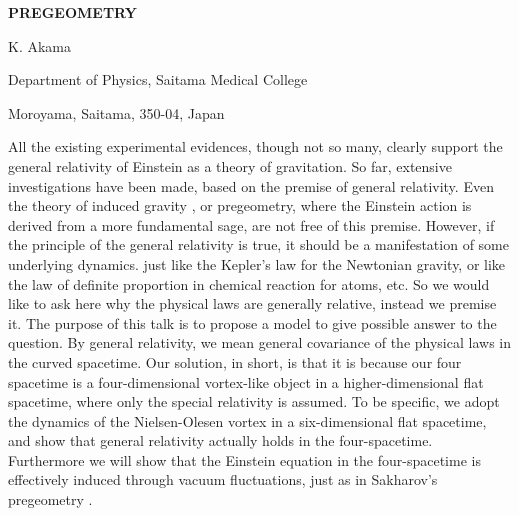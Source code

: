 \documentclass[a4paper,12pt]{article}
\begin{document}
\iffalse  %

Here we place the TeX-typeset version of the old preprint SMC-PHYS-66 (1982), 
which was published in K. Akama, "Pregeometry", in Lecture Notes in Physics, 176, 
Gauge Theory and Gravitation, Proceedings, Nara, 1982, edited by K. Kikkawa, 
N. Nakanishi and H. Nariai, (Springer-Verlag) 267--271. 
In the paper, we presented the picture that we live in a ``brane world" (in the present-
day terminology) i.e. in a dynamically localized 3-brane in a higher dimensional space.
We adopt, as an example, the dynamics of the Nielsen-Olesen vortex type 
in six dimensional spacetime to localize our space-time within a 3-brane. 
At low energies, everything is trapped in the 3-brane, 
and the Einstein gravity is induced through the fluctuations of the 3-brane.
The idea is important because it provides a way basically distinct 
from the compactification to hide the extra dimensions
which become necessary for various theoretical reasons.  

\fi


\newpage
{}

\centerline{\large\bf PREGEOMETRY}
\vskip 12pt
\centerline{K. Akama}
\centerline{Department of Physics, Saitama Medical College}
\centerline{Moroyama, Saitama, 350-04, Japan}
\vskip 12pt


All the existing experimental evidences, though not so many, clearly support the general relativity
of Einstein as a theory of gravitation.
So far, extensive investigations have been made, based on the premise of general relativity.
Even the theory of induced gravity \cite{1}, or pregeometry, where the Einstein action is derived from
a more fundamental sage, are not free of this premise.
However, if the principle of the general relativity is true,
it should be a manifestation of some underlying dynamics.
just like the Kepler's law for the Newtonian gravity, or like the law of definite proportion 
in chemical reaction for atoms, etc.
So we would like to ask here why the physical laws are generally relative, instead we premise it.
The purpose of this talk is to propose a model to give possible answer to the question.
By general relativity, we mean general covariance of the physical laws in the curved spacetime.
Our solution, in short, is that it is because our four spacetime is a four-dimensional
vortex-like object in a higher-dimensional flat spacetime, where only the special relativity is assumed.
To be specific, we adopt the dynamics of the Nielsen-Olesen vortex \cite{2} in a six-dimensional
flat spacetime, and show that general relativity actually holds in the four-spacetime.
Furthermore we will show that the Einstein equation in the four-spacetime is effectively induced
through vacuum fluctuations, just as in Sakharov's pregeometry \cite{1}.
\end{document}
